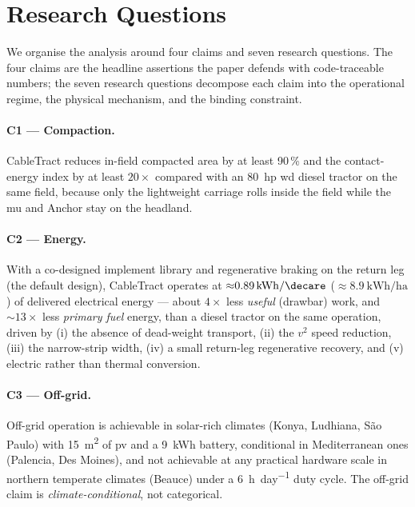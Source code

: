 \documentclass[11pt,a4paper]{article}
\begin{document}
\section{Research Questions}\label{sec:rqs}

We organise the analysis around four claims and seven research questions. The four claims are the headline assertions the paper defends with code-traceable numbers; the seven research questions decompose each claim into the operational regime, the physical mechanism, and the binding constraint.

\paragraph{C1 --- Compaction.} CableTract reduces in-field compacted area by at least 90\,\% and the contact-energy index by at least $20\times$ compared with an \SI{80}{hp} \gls{wd} diesel tractor on the same field, because only the lightweight carriage rolls inside the field while the \gls{mu} and Anchor stay on the headland.

\paragraph{C2 --- Energy.} With a co-designed implement library and regenerative braking on the return leg (the default design), CableTract operates at ${\approx}\SI{0.89}{\kWh\per\decare}$ (${\approx}\SI{8.9}{\kWh\per\hectare}$) of delivered electrical energy --- about $4\times$ less \emph{useful} (drawbar) work, and ${\sim}13\times$ less \emph{primary fuel} energy, than a diesel tractor on the same operation, driven by (i) the absence of dead-weight transport, (ii) the $v^2$ speed reduction, (iii) the narrow-strip width, (iv) a small return-leg regenerative recovery, and (v) electric rather than thermal conversion.

\paragraph{C3 --- Off-grid.} Off-grid operation is achievable in solar-rich climates (Konya, Ludhiana, São Paulo) with \SI{15}{\meter\squared} of \gls{pv} and a \SI{9}{\kWh} battery, conditional in Mediterranean ones (Palencia, Des Moines), and not achievable at any practical hardware scale in northern temperate climates (Beauce) under a \SI{6}{\hour\per day} duty cycle. The off-grid claim is \emph{climate-conditional}, not categorical.
\end{document}
